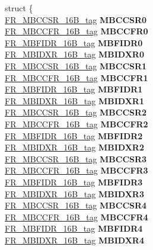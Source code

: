 \begin{DoxyCompactItemize}
\begin{tabbing}
\>struct \{\\
\>\>\mbox{\hyperlink{unionFR__MBCCSR__16B__tag}{FR\_MBCCSR\_16B\_tag}} {\bfseries MBCCSR0}\\
\>\>\mbox{\hyperlink{unionFR__MBCCFR__16B__tag}{FR\_MBCCFR\_16B\_tag}} {\bfseries MBCCFR0}\\
\>\>\mbox{\hyperlink{unionFR__MBFIDR__16B__tag}{FR\_MBFIDR\_16B\_tag}} {\bfseries MBFIDR0}\\
\>\>\mbox{\hyperlink{unionFR__MBIDXR__16B__tag}{FR\_MBIDXR\_16B\_tag}} {\bfseries MBIDXR0}\\
\>\>\mbox{\hyperlink{unionFR__MBCCSR__16B__tag}{FR\_MBCCSR\_16B\_tag}} {\bfseries MBCCSR1}\\
\>\>\mbox{\hyperlink{unionFR__MBCCFR__16B__tag}{FR\_MBCCFR\_16B\_tag}} {\bfseries MBCCFR1}\\
\>\>\mbox{\hyperlink{unionFR__MBFIDR__16B__tag}{FR\_MBFIDR\_16B\_tag}} {\bfseries MBFIDR1}\\
\>\>\mbox{\hyperlink{unionFR__MBIDXR__16B__tag}{FR\_MBIDXR\_16B\_tag}} {\bfseries MBIDXR1}\\
\>\>\mbox{\hyperlink{unionFR__MBCCSR__16B__tag}{FR\_MBCCSR\_16B\_tag}} {\bfseries MBCCSR2}\\
\>\>\mbox{\hyperlink{unionFR__MBCCFR__16B__tag}{FR\_MBCCFR\_16B\_tag}} {\bfseries MBCCFR2}\\
\>\>\mbox{\hyperlink{unionFR__MBFIDR__16B__tag}{FR\_MBFIDR\_16B\_tag}} {\bfseries MBFIDR2}\\
\>\>\mbox{\hyperlink{unionFR__MBIDXR__16B__tag}{FR\_MBIDXR\_16B\_tag}} {\bfseries MBIDXR2}\\
\>\>\mbox{\hyperlink{unionFR__MBCCSR__16B__tag}{FR\_MBCCSR\_16B\_tag}} {\bfseries MBCCSR3}\\
\>\>\mbox{\hyperlink{unionFR__MBCCFR__16B__tag}{FR\_MBCCFR\_16B\_tag}} {\bfseries MBCCFR3}\\
\>\>\mbox{\hyperlink{unionFR__MBFIDR__16B__tag}{FR\_MBFIDR\_16B\_tag}} {\bfseries MBFIDR3}\\
\>\>\mbox{\hyperlink{unionFR__MBIDXR__16B__tag}{FR\_MBIDXR\_16B\_tag}} {\bfseries MBIDXR3}\\
\>\>\mbox{\hyperlink{unionFR__MBCCSR__16B__tag}{FR\_MBCCSR\_16B\_tag}} {\bfseries MBCCSR4}\\
\>\>\mbox{\hyperlink{unionFR__MBCCFR__16B__tag}{FR\_MBCCFR\_16B\_tag}} {\bfseries MBCCFR4}\\
\>\>\mbox{\hyperlink{unionFR__MBFIDR__16B__tag}{FR\_MBFIDR\_16B\_tag}} {\bfseries MBFIDR4}\\
\>\>\mbox{\hyperlink{unionFR__MBIDXR__16B__tag}{FR\_MBIDXR\_16B\_tag}} {\bfseries MBIDXR4}\\

\end{tabbing}
\end{DoxyCompactItemize}
